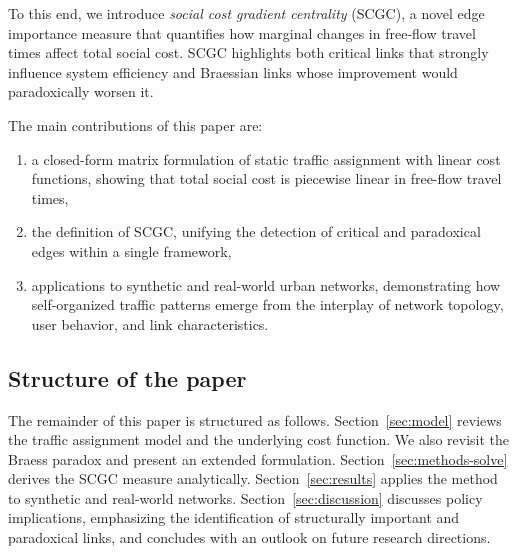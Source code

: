 \documentclass[twocolumn,english,groupedaddress, superscriptaddress,aps,pre,10pt,floatfix]{revtex4-2}
\begin{document}
To this end, we introduce \emph{social cost gradient centrality} (SCGC), a novel edge importance measure that quantifies how marginal changes in free-flow travel times affect total social cost. SCGC highlights both critical links that strongly influence system efficiency and Braessian links whose improvement would paradoxically worsen it.

The main contributions of this paper are:
\begin{enumerate}
    \item a closed-form matrix formulation of static traffic assignment with linear cost functions, showing that total social cost is piecewise linear in free-flow travel times,
    \item the definition of SCGC, unifying the detection of critical and paradoxical edges within a single framework,
    \item applications to synthetic and real-world urban networks, demonstrating how self-organized traffic patterns emerge from the interplay of network topology, user behavior, and link characteristics. 
\end{enumerate}

\subsection{Structure of the paper}

The remainder of this paper is structured as follows. Section~\ref{sec:model} reviews the traffic assignment model and the underlying cost function. We also revisit the Braess paradox and present an extended formulation. Section~\ref{sec:methods-solve} derives the SCGC measure analytically. Section~\ref{sec:results} applies the method to synthetic and real-world networks. Section~\ref{sec:discussion} discusses policy implications, emphasizing the identification of structurally important and paradoxical links, and concludes with an outlook on future research directions.
\end{document}
